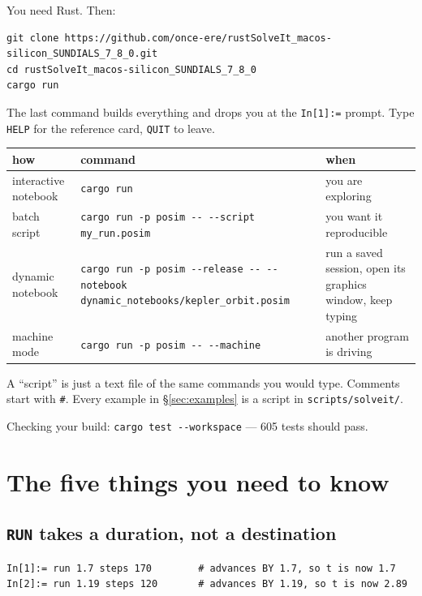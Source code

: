 \documentclass[11pt]{article}
\newcommand{\kw}[1]{\texttt{\uppercase{#1}}}
\newcommand{\code}[1]{\texttt{#1}}
\begin{document}
You need Rust. Then:

\begin{lstlisting}
git clone https://github.com/once-ere/rustSolveIt_macos-silicon_SUNDIALS_7_8_0.git
cd rustSolveIt_macos-silicon_SUNDIALS_7_8_0
cargo run
\end{lstlisting}

The last command builds everything and drops you at the \code{In[1]:=}
prompt. Type \kw{help} for the reference card, \kw{quit} to leave.

\begin{center}
\begin{tabular}{p{3.4cm}p{7.4cm}p{3.6cm}}
\textbf{how} & \textbf{command} & \textbf{when}\\\hline
interactive notebook & \code{cargo run} & you are exploring\\
batch script & \code{cargo run -p posim -{}- -{}-script my\_run.posim} &
you want it reproducible\\
dynamic notebook & \code{cargo run -p posim -{}-release -{}- -{}-notebook
dynamic\_notebooks/kepler\_orbit.posim} & run a saved session, open its
graphics window, keep typing\\
machine mode & \code{cargo run -p posim -{}- -{}-machine} & another
program is driving\\
\end{tabular}
\end{center}

A ``script'' is just a text file of the same commands you would type.
Comments start with \code{\#}. Every example in \S\ref{sec:examples} is a
script in \code{scripts/solveit/}.

Checking your build: \code{cargo test -{}-workspace} --- 605 tests should
pass.

\section{The five things you need to know}

\subsection{\kw{run} takes a duration, not a destination}

\begin{lstlisting}
In[1]:= run 1.7 steps 170        # advances BY 1.7, so t is now 1.7
In[2]:= run 1.19 steps 120       # advances BY 1.19, so t is now 2.89
\end{lstlisting}
\end{document}
